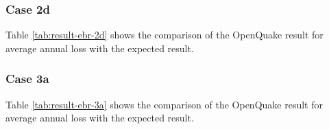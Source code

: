 \subsubsection{Case 2d}


Table \ref{tab:result-ebr-2d} shows the comparison of the OpenQuake result for average annual loss with the expected result.

\subsubsection{Case 3a}


Table \ref{tab:result-ebr-3a} shows the comparison of the OpenQuake result for average annual loss with the expected result.
